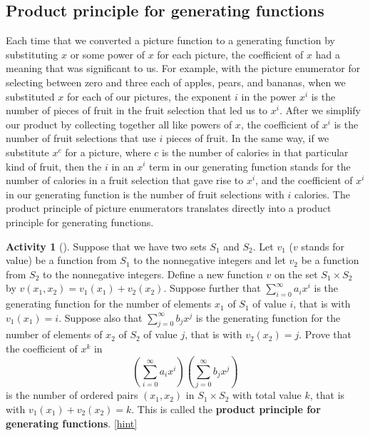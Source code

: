 \documentclass[10pt,]{book}
\newcommand{\terminology}[1]{\textbf{#1}}
\theoremstyle{plain}
\theoremstyle{definition}
\theoremstyle{definition}
\theoremstyle{definition}
\newtheorem{activity}[project]{Activity}
\numberwithin{equation}{chapter}
\begin{document}
\subsection[{Product principle for generating functions}]{Product principle for generating functions}\label{subsection-34}
\hypertarget{p-1297}{}%
Each time that we converted a picture function to a generating function by substituting \(x\) or some power of \(x\) for each picture, the coefficient of \(x\) had a meaning that was significant to us. For example, with the picture enumerator for selecting between zero and three each of apples, pears, and bananas, when we substituted \(x\) for each of our pictures, the exponent \(i\) in the power \(x^i\) is the number of pieces of fruit in the fruit selection that led us to \(x^i\). After we simplify our product by collecting together all like powers of \(x\), the coefficient of \(x^i\) is the number of fruit selections that use \(i\) pieces of fruit. In the same way, if we substitute \(x^c\) for a picture, where \(c\) is the number of calories in that particular kind of fruit, then the \(i\) in an \(x^i\) term in our generating function stands for the number of calories in a fruit selection that gave rise to \(x^i\), and the coefficient of \(x^i\) in our generating function is the number of fruit selections with \(i\) calories.  The product principle of picture enumerators translates directly into a product principle for generating functions.%
\begin{activity}[]\label{ProductPrincipleOGF}
\hypertarget{p-1298}{}%
Suppose that we have two sets \(S_1\) and \(S_2\). Let \(v_1\) (\(v\) stands for value) be a function from \(S_1\) to the nonnegative integers and let \(v_2\) be a function from \(S_2\) to the nonnegative integers.  Define a new function \(v\) on the set \(S_1 \times S_2\) by \(v(x_1,x_2) = v_1(x_1) +v_2(x_2)\). Suppose further that \(\sum_{i=0}^\infty a_ix^i\) is the generating function for the number of elements \(x_1\) of \(S_1\) of value \(i\), that is with \(v_1(x_1)=i\). Suppose also that \(\sum_{j=0}^\infty b_j x^j\) is the generating function for the number of elements of \(x_2\) of \(S_2\) of value \(j\), that is with \(v_2(x_2) = j\).  Prove that the coefficient of \(x^k\) in%
\begin{equation*}
\left(\sum_{i=0}^\infty a_ix^i\right)\left(\sum_{j=0}^\infty
b_jx^j\right)
\end{equation*}
is the number of ordered pairs \((x_1,x_2)\) in \(S_1\times S_2\) with total value \(k\), that is with \(v_1(x_1) +v_2(x_2) =k\). This is called the \terminology{product principle for generating functions}.%
\hfill{\tiny\hyperlink{a-249}{[hint]}\hypertarget{q-249}{}}\end{activity}
\end{document}
